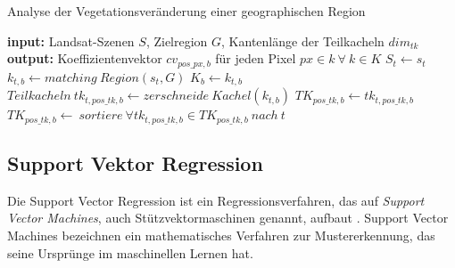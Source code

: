 \begin{algorithm}[H]
\small
\caption{Analyse der Vegetationsveränderung einer geographischen Region}
\label{alg:generalAlgorithm}
\begin{algorithmic}[1]
	\State \textbf{input:} Landsat-Szenen $S$, Zielregion $G$, Kantenlänge der Teilkacheln $dim_{tk}$
	\State \textbf{output:} Koeffizientenvektor $cv_{pos\_px, b}$ für jeden Pixel $px \in k\ \forall\ k \in K$
        		\State $S_t \leftarrow s_t $ \label{alg:groupOriginalScenes}
	\EndFor
	 \label{alg:dataCubeCreation}
			\State $k_{t, b} \leftarrow matching\ Region (s_t, G)$ \label{alg:cutAllTilesOfAGroup}
			\State $K_{b} \leftarrow k_{t, b}$ \label{alg:groupTiles}
		\EndFor
	\EndFor
	 \label{alg:flatMapOperator}
		\State $Teilkacheln\ tk_{t, pos\_tk, b} \leftarrow zerschneide\ Kachel (k_{t, b})$ \label{alg:sliceAllTiles}
		\State $TK_{pos\_tk, b} \leftarrow tk_{t, pos\_tk, b}$ \label{alg:groupSubscenes}
	\EndFor
		\State $TK_{pos\_tk, b} \leftarrow\ sortiere\ \forall tk_{t, pos\_tk, b} \in TK_{pos\_tk, b}\ nach\ t$ \label{alg:sortSubscenes}
		 \label{alg:createPixelTimeSeriesLoopStart}
				 \label{alg:createPixelTimeSeries}
			\EndFor
		\EndFor \label{alg:createPixelTimeSeriesLoopEnd}
			 \label{alg:approxPixelTimeSeries}
		\EndFor
	\EndFor
\EndFunction

\end{algorithmic}
\end{algorithm}

\subsection{Support Vektor Regression}
\label{subsec:svr}
Die Support Vector Regression ist ein Regressionsverfahren, das auf \textit{Support Vector Machines}, auch Stützvektormaschinen genannt, aufbaut \cite{Drucker97}. Support Vector Machines bezeichnen ein mathematisches Verfahren zur Mustererkennung, das seine Ursprünge im maschinellen Lernen hat. 

